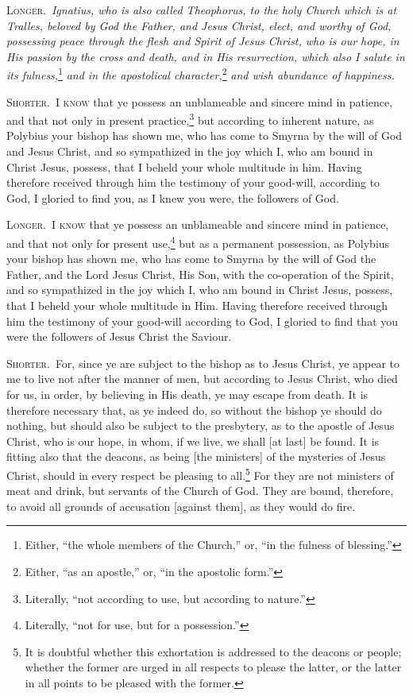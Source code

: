 \textsc{Longer.}~\emph{Ignatius, who is also called Theophorus, to the holy Church which is at Tralles, beloved by God the Father, and Jesus Christ, elect, and worthy of God, possessing peace through the flesh and Spirit of Jesus Christ, who is our hope, in His passion by the cross and death, and in His resurrection, which also I salute in its fulness,}\footnote{Either, “the whole members of the Church,” or, “in the fulness of blessing.”}\emph{ and in the apostolical character,}\footnote{Either, “as an apostle,” or, “in the apostolic form.”}\emph{ and wish abundance of happiness.}


\textsc{Shorter.}~\textsc{I know} that ye possess an unblameable and sincere mind in patience, and that not only in present practice,\footnote{Literally, “not according to use, but according to nature.”} but according to inherent nature, as Polybius your bishop has shown me, who has come to Smyrna by the will of God and Jesus Christ, and so sympathized in the joy which I, who am bound in Christ Jesus, possess, that I beheld your whole multitude in him. Having therefore received through him the testimony of your good-will, according to God, I gloried to find you, as I knew you were, the followers of God.

\textsc{Longer.}~\textsc{I know} that ye possess an unblameable and sincere mind in patience, and that not only for present use,\footnote{Literally, “not for use, but for a possession.”} but as a permanent possession, as Polybius your bishop has shown me, who has come to Smyrna by the will of God the Father, and the Lord Jesus Christ, His Son, with the co-operation of the Spirit, and so sympathized in the joy which I, who am bound in Christ Jesus, possess, that I beheld your whole multitude in Him. Having therefore received through him the testimony of your good-will according to God, I gloried to find that you were the followers of Jesus Christ the Saviour.


\textsc{Shorter.}~For, since ye are subject to the bishop as to Jesus Christ, ye appear to me to live not after the manner of men, but according to Jesus Christ, who died for us, in order, by believing in His death, ye may escape from death. It is therefore necessary that, as ye indeed do, so without the bishop ye should do nothing, but should also  be subject to the presbytery, as to the apostle of Jesus Christ, who is our hope, in whom, if we live, we shall [at last] be found. It is fitting also that the deacons, as being [the ministers] of the mysteries of Jesus Christ, should in every respect be pleasing to all.\footnote{It is doubtful whether this exhortation is addressed to the deacons or people; whether the former are urged in all respects to please the latter, or the latter in all points to be pleased with the former.} For they are not ministers of meat and drink, but servants of the Church of God. They are bound, therefore, to avoid all grounds of accusation [against them], as they would do fire.

